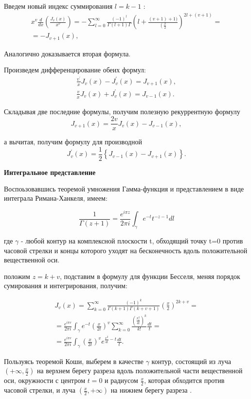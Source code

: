 Введем новый индекс суммирования $l=k-1$ :
\[
\begin{aligned}
	x^{v} \frac{d}{d x}\left(\frac{J_{v}(x)}{x^{v}}\right)=-\sum_{l=0}^{\infty} \frac{(-1)^{l}}{\Gamma(l+1) \Gamma}\left(l+\frac{(v+1)+1)}{\left(\frac{x}{2}\right.}\right)^{2 l+(v+1)}= \\
	=-J_{v+1}(x),
\end{aligned}
\]

Аналогично доказывается вторая формула.

Произведем дифференцирование обеих формул:
\[
\begin{aligned}
	\frac{v^{\prime}}{x} J_{v}(x)-J_{v}^{\prime}(x)=J_{v+1}(x), \\
	\frac{v}{x} J_{v}(x)+J_{v}^{\prime}(x)=J_{v-1}(x) .
\end{aligned}
\]

Складывая две последние формулы, получим полезную рекуррентную формулу
\[
J_{v+1}(x)=\frac{2 v}{x} J_{v}(x)-J_{v-1}(x),
\]

а вычитая, получим формулу для производной
\[
J_{v}^{\prime}(x)=\frac{1}{2}\left\{J_{v-1}(x)-J_{v+1}(x)\right\} .
\]

\textbf{Интегральное представление}

Воспоьзовавшись теоремой умножения Гамма-функция и представлением в виде интеграла Римана-Ханкеля, имеем:

\[
\frac{1}{\Gamma(z+1)} = \frac{e^{i\pi z}}{2 \pi i}\int_{\gamma} e^{-t} t^{-z-1}dl
\]

где $\gamma$ - любой контур на комплексной плоскости t, обходящий точку t=0 против часовой стрелки и концы которого уходят на бесконечность вдоль положительной вещественной оси.

положим $z = k + v$, подставим в формулу для функции Бесселя, меняя порядок сумирования и интегрирования, получим:

\[
\begin{aligned}
	J_{v}(x)=\sum_{k=0}^{\infty} \frac{(-1)^{k}}{\Gamma(k+1) \Gamma(k+v+1)}\left(\frac{x}{2}\right)^{2 k+v}= \\
	=\frac{e^{i \pi v}}{2 \pi i} \int_{\gamma} e^{-t}\left(\frac{x}{2 t}\right)^{v} \sum_{k=0}^{\infty} \frac{\left(\frac{x_{1}^{2}}{4 t}\right)^{k}}{k !} \frac{d t}{t}= \\
	=\frac{e^{i \pi v}}{2 \pi i} \int_{\gamma}\left(\frac{x}{2 t}\right)^{v} e^{\frac{x^{2}}{4 t}-t} \frac{d t}{t} .
\end{aligned}
\]

Пользуясь теоремой Коши, выберем в качестве $\gamma$ контур, состоящий из луча $\left(+\infty, \frac{x}{2}\right)$ на верхнем берегу разреза вдоль положительной части вещественной оси, окружности с центром $t=0$ и радиусом $\frac{x}{2}$, которая обходится против часовой стрелки, и луча $\left(\frac{x}{2},+\infty\right)$ на нижнем берегу разреза .

